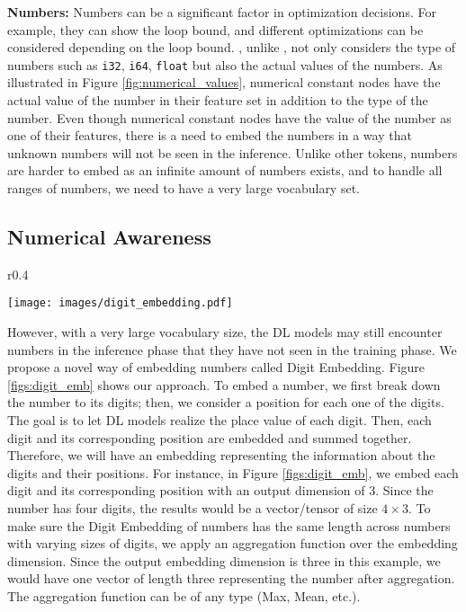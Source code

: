\textbf{Numbers:} Numbers can be a significant factor in optimization decisions. For example, they can show the loop bound, and different optimizations can be considered depending on the loop bound. 
\ourtool, unlike \programl, not only considers the type of numbers such as \texttt{i32}, \texttt{i64}, \texttt{float} but also the actual values of the numbers.
As illustrated in Figure \ref{fig:numerical_values}, numerical constant nodes have the actual value of the number in their feature set in addition to the type of the number. Even though numerical constant nodes have the value of the number as one of their features, there is a need to embed the numbers in a way that unknown numbers will not be seen in the inference.
Unlike other tokens, numbers are harder to embed as an infinite amount of numbers exists, and to handle all ranges of numbers, we need to have a very large vocabulary set.
\vspace{-7pt}
\subsection{Numerical Awareness}
\begin{wrapfigure}{r}{0.4\textwidth}
\vspace{-50pt}
  \begin{center}
\texttt{[image: images/digit\_embedding.pdf]}
\caption{Overview of the digit embedding.}
\label{figs:digit_emb}
  \end{center}
  \vspace{-10pt}
\end{wrapfigure}
However, with a very large vocabulary size, the DL models may still encounter numbers in the inference phase that they have not seen in the training phase.
We propose a novel way of embedding numbers called Digit Embedding.
Figure \ref{figs:digit_emb} shows our approach. To embed a number, we first break down the number to its digits; then, we consider a position for each one of the digits. The goal is to let DL models realize the place value of each digit. Then, each digit and its corresponding position are embedded and summed together. Therefore, we will have an embedding representing the information about the digits and their positions. For instance, in Figure \ref{figs:digit_emb}, we embed each digit and its corresponding position with an output dimension of 3. Since the number has four digits, the results would be a vector/tensor of size $4\times3$. To make sure the Digit Embedding of numbers has the same length across numbers with varying sizes of digits, we apply an aggregation function over the embedding dimension. Since the output embedding dimension is three in this example, we would have one vector of length three representing the number after aggregation. The aggregation function can be of any type (Max, Mean, etc.). 
\vspace{-10pt}
